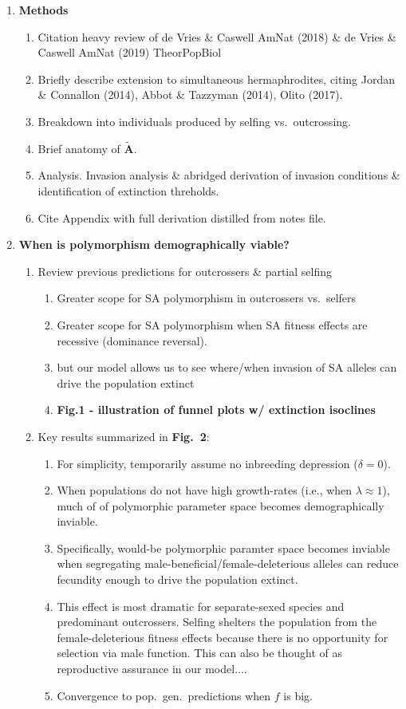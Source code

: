 \documentclass[11pt]{article}
\begin{document}
\begin{enumerate}
	\item {\bf Methods}
		\begin{enumerate}
			\item Citation heavy review of de Vries \& Caswell AmNat (2018) \& de Vries \& Caswell AmNat (2019) TheorPopBiol
			\item Briefly describe extension to simultaneous hermaphrodites, citing Jordan \& Connallon (2014), Abbot \& Tazzyman (2014), Olito (2017). 
			\item Breakdown into individuals produced by selfing vs.~outcrossing.
			\item Brief anatomy of $\mathbf{\tilde{A}}$.
			\item Analysis. Invasion analysis \& abridged derivation of invasion conditions \& identification of extinction threholds.
			\item Cite Appendix with full derivation distilled from notes file.
		\end{enumerate}

	\item {\bf When is polymorphism demographically viable?}
	\begin{enumerate}
		\item Review previous predictions for outcrossers \& partial selfing
		\begin{enumerate}
			\item Greater scope for SA polymorphism in outcrossers vs.~selfers
			\item Greater scope for SA polymorphism when SA fitness effects are recessive (dominance reversal).
			\item but our model allows us to see where/when invasion of SA alleles can drive the population extinct
			\item \textbf{Fig.1 - illustration of funnel plots w/ extinction isoclines}
		\end{enumerate}

		\item Key results summarized in \textbf{Fig.~2}: 
		\begin{enumerate}
			\item For simplicity, temporarily assume no inbreeding depression ($\delta = 0$).
			\item When populations do not have high growth-rates (i.e., when $\lambda \approx 1$), much of of polymorphic parameter space becomes demographically inviable.
			\item Specifically, would-be polymorphic paramter space becomes inviable when segregating male-beneficial/female-deleterious alleles can reduce fecundity enough to drive the population extinct.
			\item This effect is most dramatic for separate-sexed species and predominant outcrossers. Selfing shelters the population from the female-deleterious fitness effects because there is no opportunity for selection via male function. This can also be thought of as reproductive assurance in our model....
			\item Convergence to pop.~gen.~predictions when $f$ is big.
		\end{enumerate}
	\end{enumerate}


\end{enumerate}
\end{document}
